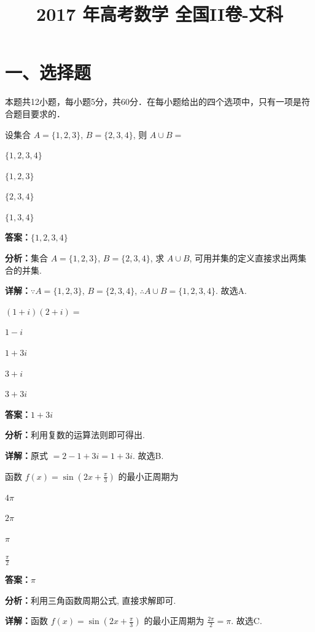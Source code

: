 ﻿\title{2017 年高考数学 全国II卷-文科}
\date{}
\maketitle

\section*{一、选择题}
本题共12小题，每小题5分，共60分．在每小题给出的四个选项中，只有一项是符合题目要求的．

\begin{question}[points=5]
设集合 $A=\{1,2,3\}$, $B=\{2,3,4\}$, 则 $A\cup B=$
\begin{choices}
  \item $\{1,2,3,4\}$
  \item $\{1,2,3\}$
  \item $\{2,3,4\}$
  \item $\{1,3,4\}$
\end{choices}
\begin{solution}
\textbf{答案：}$\{1,2,3,4\}$

\textbf{分析：}集合 $A=\{1,2,3\}$, $B=\{2,3,4\}$, 求 $A\cup B$, 可用并集的定义直接求出两集合的并集.

\textbf{详解：}$\because A=\{1,2,3\}$, $B=\{2,3,4\}$, $\therefore A\cup B=\{1,2,3,4\}$. 故选A.
\end{solution}
\end{question}

\begin{question}[points=5]
$(1+i)(2+i)=$
\begin{choices}
  \item $1-i$
  \item $1+3i$
  \item $3+i$
  \item $3+3i$
\end{choices}
\begin{solution}
\textbf{答案：}$1+3i$

\textbf{分析：}利用复数的运算法则即可得出.

\textbf{详解：}原式 $=2-1+3i=1+3i$. 故选B.
\end{solution}
\end{question}

\begin{question}[points=5]
函数 $f(x)=\sin\left(2x+\frac{\pi}{3}\right)$ 的最小正周期为
\begin{choices}
  \item $4\pi$
  \item $2\pi$
  \item $\pi$
  \item $\frac{\pi}{2}$
\end{choices}
\begin{solution}
\textbf{答案：}$\pi$

\textbf{分析：}利用三角函数周期公式, 直接求解即可.

\textbf{详解：}函数 $f(x)=\sin\left(2x+\frac{\pi}{3}\right)$ 的最小正周期为 $\frac{2\pi}{2}=\pi$. 故选C.
\end{solution}
\end{question}

